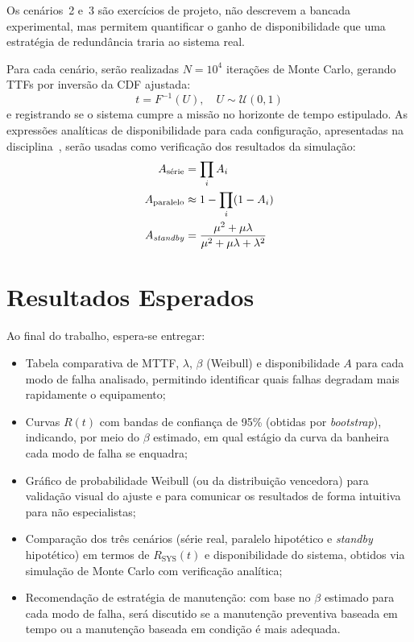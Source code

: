 \documentclass[conference]{IEEEtran}
\begin{document}
Os cenários~2 e~3 são exercícios de projeto, não descrevem a bancada
experimental, mas permitem quantificar o ganho de disponibilidade que
uma estratégia de redundância traria ao sistema real.

Para cada cenário, serão realizadas $N = 10^4$ iterações de Monte
Carlo, gerando TTFs por inversão da CDF ajustada:
\begin{equation}
    t = F^{-1}(U), \quad U \sim \mathcal{U}(0,1)
\end{equation}
e registrando se o sistema cumpre a missão no horizonte de tempo
estipulado. As expressões analíticas de disponibilidade para cada
configuração, apresentadas na disciplina~\cite{bessani2026}, serão usadas
como verificação dos resultados da simulação:
\begin{align}
    A_{\text{série}} &= \prod_{i} A_i \\
    A_{\text{paralelo}} &\approx 1 - \prod_{i}(1 - A_i) \\
    A_{\text{\textit{standby}}} &= \frac{\mu^2 + \mu\lambda}{\mu^2 + \mu\lambda + \lambda^2}
\end{align}

\section{Resultados Esperados}

Ao final do trabalho, espera-se entregar:

\begin{itemize}
    \item Tabela comparativa de MTTF, $\lambda$, $\beta$
    (Weibull) e disponibilidade $A$ para cada modo de falha analisado,
    permitindo identificar quais falhas degradam mais rapidamente o
    equipamento;
    \item Curvas $R(t)$ com bandas de confiança de 95\%
    (obtidas por \textit{bootstrap}), indicando, por meio do $\beta$
    estimado, em qual estágio da curva da banheira cada modo de falha
    se enquadra;
    \item Gráfico de probabilidade Weibull (ou da distribuição
    vencedora) para validação visual do ajuste e para comunicar os
    resultados de forma intuitiva para não especialistas;
    \item Comparação dos três cenários (série real, paralelo
    hipotético e \textit{standby} hipotético) em termos de
    $R_{\text{SYS}}(t)$ e disponibilidade do sistema, obtidos via
    simulação de Monte Carlo com verificação analítica;
    \item Recomendação de estratégia de manutenção: com base
    no $\beta$ estimado para cada modo de falha, será discutido se a
    manutenção preventiva baseada em tempo ou a manutenção baseada em
    condição é mais adequada.
\end{itemize}
\end{document}
